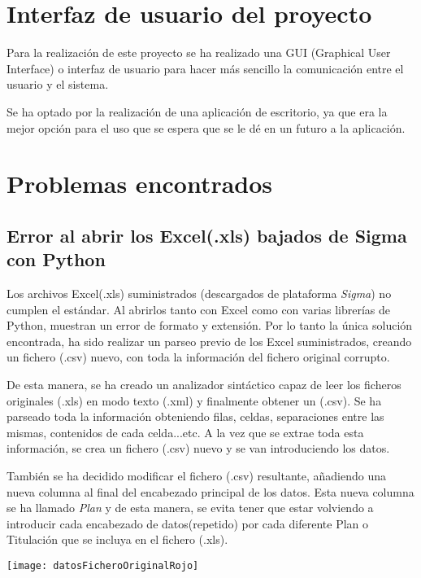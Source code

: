\section{Interfaz de usuario del proyecto}\label{interfaz_de_usuario_del_proyecto}
Para la realización de este proyecto se ha realizado una GUI (Graphical User Interface) o interfaz de usuario para hacer más sencillo la comunicación entre el usuario y el sistema.

Se ha optado por la realización de una aplicación de escritorio, ya que era la mejor opción para el uso que se espera que se le dé en un futuro a la aplicación.



\section{Problemas encontrados}

\subsection{Error al abrir los Excel(.xls) bajados de Sigma con Python}
Los archivos Excel(.xls) suministrados (descargados de plataforma \emph{Sigma}) no cumplen el estándar. Al abrirlos tanto con Excel como con varias librerías de Python, muestran un error de formato y extensión. Por lo tanto la única solución encontrada, ha sido realizar un parseo previo de los Excel suministrados, creando un fichero (.csv) nuevo, con toda la información del fichero original corrupto.

De esta manera, se ha creado un analizador sintáctico capaz de leer los ficheros originales (.xls) en modo texto (.xml) y finalmente obtener un (.csv). Se ha parseado toda la información obteniendo filas, celdas, separaciones entre las mismas, contenidos de cada celda...etc. A la vez que se extrae toda esta información, se crea un fichero (.csv) nuevo y se van introduciendo los datos.

También se ha decidido modificar el fichero (.csv) resultante, añadiendo una nueva columna al final del encabezado principal de los datos. Esta nueva columna se ha llamado \emph{Plan} y de esta manera, se evita tener que estar volviendo a introducir cada encabezado de datos(repetido) por cada diferente Plan o Titulación que se incluya en el fichero (.xls).


\texttt{[image: datosFicheroOriginalRojo]}

